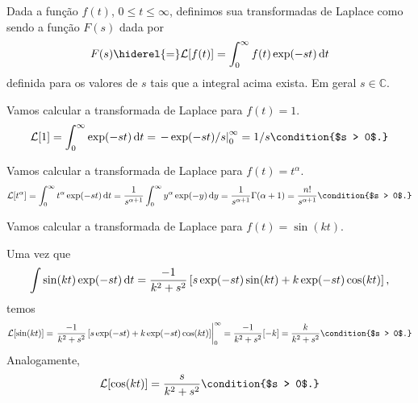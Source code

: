 \begin{defi}
  Dada a função $f(t)$, $0 \leq t \leq \infty$, definimos sua transformadas de
  Laplace como sendo a função $F(s)$ dada por
  \begin{dmath*}
    F(s) \hiderel{=} \mathcal{L}[f(t)] = \int_0^{\infty} f(t) \exp(-s t) \vi{t}
  \end{dmath*}
  definida para os valores de $s$ tais que a integral acima exista. Em geral $s
  \in \mathbb{C}$.
\end{defi}

\begin{exem}
  Vamos calcular a transformada de Laplace para $f(t) = 1$.
  \begin{dmath*}
    \mathcal{L}[1] = \int_0^{\infty} \exp(-s t) \vi{t}
    = \left. - \exp(-s t) / s \right|_0^{\infty}
    = 1 / s \condition{$s > 0$.}
  \end{dmath*}
\end{exem}

\begin{exem}
  Vamos calcular a transformada de Laplace para $f(t) = t^{\alpha}$.
  \begin{dmath*}
    \mathcal{L}[t^{\alpha}] = \int_0^{\infty} t^{\alpha} \exp(-s t) \vi{t}
    = \frac{1}{s^{\alpha + 1}} \int_0^{\infty} y^{\alpha} \exp(-y) \vi{y}
    = \frac{1}{s^{\alpha + 1}} \Gamma(\alpha + 1)
    = \frac{n!}{s^{\alpha + 1}} \condition{$s > 0$.}
  \end{dmath*}
\end{exem}

\begin{exem}
  Vamos calcular a transformada de Laplace para $f(t) = \sin(kt)$.

  Uma vez que
  \begin{dmath*}
    \int \sin(k t) \exp(-s t) \vi{t} = \frac{-1}{k^2 + s^2} \left[ s \exp(-s t)
    \sin(k t) + k \exp(-s t) \cos(k t) \right],
  \end{dmath*}
  temos
  \begin{dmath*}
    \mathcal{L}[\sin(k t)] = \left. \frac{-1}{k^2 + s^2} \left[ s \exp(-s t) + k
    \exp(-s t) \cos(k t) \right] \right|_0^{\infty}
    = \frac{-1}{k^2 + s^2} [-k]
    = \frac{k}{k^2 + s^2} \condition{$s > 0$.}
  \end{dmath*}
  Analogamente,
  \begin{dmath*}
    \mathcal{L}[\cos(k t)] = \frac{s}{k^2 + s^2} \condition{$s > 0$.}
  \end{dmath*}
\end{exem}

